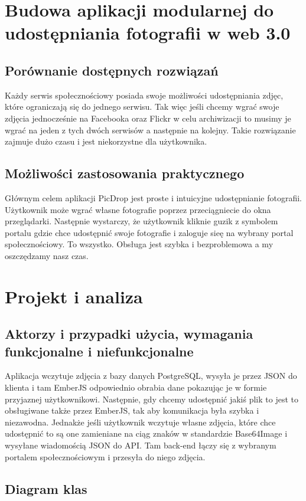\documentclass[brudnopis]{xmgr}
\begin{document}
\chapter{Budowa aplikacji modularnej do udostępniania fotografii  w web 3.0}

\section{Porównanie dostępnych rozwiązań}
Każdy serwis społecznościowy posiada swoje możliwości udostępniania zdjęc, które ograniczają się do jednego serwisu. Tak więc jeśli chcemy wgrać swoje zdjęcia jednocześnie na Facebooka oraz Flickr w celu archiwizacji to musimy je wgrać na jeden z tych dwóch serwisów a następnie na kolejny. Takie rozwiązanie zajmuje dużo czasu i jest niekorzystne dla użytkownika.
\section{Możliwości zastosowania praktycznego}
Głównym celem aplikacji PicDrop jest proste i intuicyjne udostępnianie fotografii. Użytkownik może wgrać własne fotografie poprzez przeciągniecie do okna przeglądarki. Następnie wystarczy, że użytkownik kliknie guzik z symbolem portalu gdzie chce udostępnić swoje fotografie i zaloguje sieę na wybrany portal społecznościowy. To wszystko. Obsługa jest szybka i bezproblemowa a my oszczędzamy nasz czas.

\chapter{Projekt i analiza}
\section{Aktorzy i przypadki użycia, wymagania funkcjonalne i niefunkcjonalne}
Aplikacja wczytuje zdjęcia z bazy danych PostgreSQL, wysyła je przez JSON do klienta i tam EmberJS odpowiednio obrabia dane pokazując je w formie przyjaznej użytkownikowi. Następnie, gdy chcemy udostępnić jakiś plik to jest to obsługiwane także przez EmberJS, tak aby komunikacja była szybka i niezawodna. Jednakże jeśli użytkownik wczytuje własne zdjęcia, które chce udostępnić to są one zamieniane na ciąg znaków w standardzie Base64Image i wysyłane wiadomością JSON do API. Tam back-end łączy się z wybranym portalem społecznościowym i przesyła do niego zdjęcia. 
\section{Diagram klas}
\end{document}
